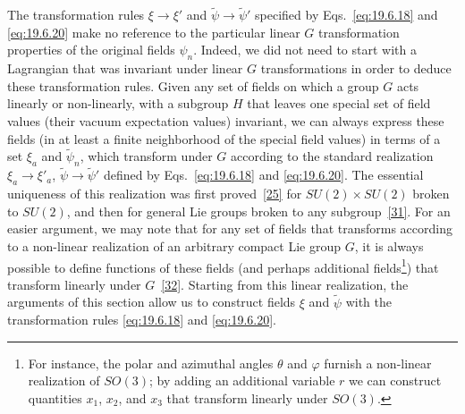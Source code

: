 The transformation rules $\xi\to\xi'$ and $\widetilde\psi\to\widetilde\psi'$ specified by Eqs.~\eqref{eq:19.6.18} and \eqref{eq:19.6.20} make no reference to the particular linear $G$ transformation properties of the original fields $\psi_n$. Indeed, we did not need to start with a Lagrangian that was invariant under linear $G$ transformations in order to deduce these transformation rules. Given any set of fields on which a group $G$ acts linearly or non-linearly, with a subgroup $H$ that leaves one special set of field values (their vacuum expectation values) invariant, we can always express these fields (in at least a finite neighborhood of the special field values) in terms of a set $\xi_a$ and $\widetilde\psi_n$, which transform under $G$ according to the standard realization $\xi_a\to\xi'_a$, $\widetilde\psi\to\widetilde\psi'$ defined by Eqs.~\eqref{eq:19.6.18} and \eqref{eq:19.6.20}. The essential uniqueness of this realization was first proved~\hyperref[ch19-ref-25]{[25]} for $SU(2)\times SU(2)$ broken to $SU(2)$, and then for general Lie groups broken to any subgroup~\hyperref[ch19-ref-31]{[31]}. For an easier argument, we may note that for any set of fields that transforms according to a non-linear realization of an arbitrary compact Lie group $G$, it is always possible to define functions of these fields (and perhaps additional fields\footnote{For instance, the polar and azimuthal angles $\theta$ and $\varphi$ furnish a non-linear realization of $SO(3)$; by adding an additional variable $r$ we can construct quantities $x_1$, $x_2$, and $x_3$ that transform linearly under $SO(3)$.}) that transform linearly under $G$~\hyperref[ch19-ref-32]{[32]}. Starting from this linear realization, the arguments of this section allow us to construct fields $\xi$ and $\widetilde\psi$ with the transformation rules \eqref{eq:19.6.18} and \eqref{eq:19.6.20}.

